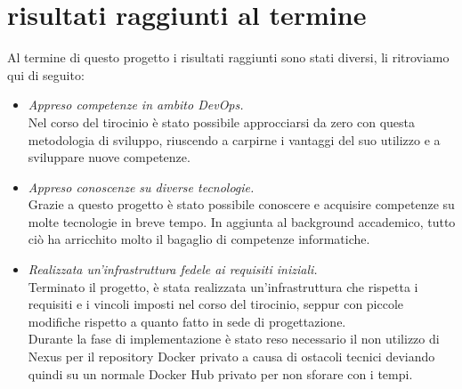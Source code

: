 \documentclass[a4paper,12pt]{report}
\begin{document}
\section{risultati raggiunti al termine}
Al termine di questo progetto i risultati raggiunti sono stati diversi, li ritroviamo qui di seguito:\\
\begin{itemize}
\item \textit{Appreso competenze in ambito DevOps.}\\
Nel corso del tirocinio è stato possibile approcciarsi da zero con questa metodologia di sviluppo, riuscendo a carpirne i vantaggi del suo utilizzo e a sviluppare nuove competenze.\\
\item \textit{Appreso conoscenze su diverse tecnologie.}\\
Grazie a questo progetto è stato possibile conoscere e acquisire competenze su molte tecnologie in breve tempo. In aggiunta al background accademico, tutto ciò ha arricchito molto il bagaglio di competenze informatiche.\\
\item \textit{Realizzata un'infrastruttura fedele ai requisiti iniziali.}\\
Terminato il progetto, è stata realizzata un'infrastruttura che rispetta i requisiti e i vincoli imposti nel corso del tirocinio, seppur con piccole modifiche rispetto a quanto fatto in sede di progettazione.\\
Durante la fase di implementazione è stato reso necessario il non utilizzo di Nexus per il repository Docker privato a causa di ostacoli tecnici deviando quindi su un normale Docker Hub privato per non sforare con i tempi.
\end{itemize}
\end{document}
